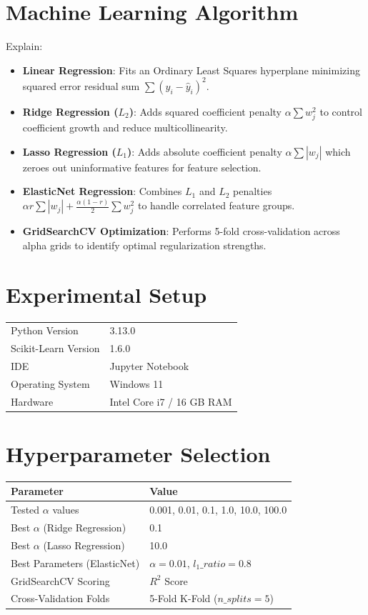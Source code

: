 \documentclass[12pt,a4paper]{article}
\begin{document}
\section{Machine Learning Algorithm}

Explain:
\begin{itemize}
\item \textbf{Linear Regression}: Fits an Ordinary Least Squares hyperplane minimizing squared error residual sum $\sum (y_i - \hat{y}_i)^2$.
\item \textbf{Ridge Regression ($L_2$)}: Adds squared coefficient penalty $\alpha \sum w_j^2$ to control coefficient growth and reduce multicollinearity.
\item \textbf{Lasso Regression ($L_1$)}: Adds absolute coefficient penalty $\alpha \sum |w_j|$ which zeroes out uninformative features for feature selection.
\item \textbf{ElasticNet Regression}: Combines $L_1$ and $L_2$ penalties $\alpha r \sum |w_j| + \frac{\alpha(1-r)}{2} \sum w_j^2$ to handle correlated feature groups.
\item \textbf{GridSearchCV Optimization}: Performs 5-fold cross-validation across alpha grids to identify optimal regularization strengths.
\end{itemize}

\section{Experimental Setup}

\begin{tabular}{ll}
\toprule
Python Version & 3.13.0 \\
Scikit-Learn Version & 1.6.0 \\
IDE & Jupyter Notebook \\
Operating System & Windows 11 \\
Hardware & Intel Core i7 / 16 GB RAM \\
\bottomrule
\end{tabular}

\section{Hyperparameter Selection}

\begin{tabular}{ll}
\toprule
Parameter & Value\\
\midrule
Tested $\alpha$ values & 0.001, 0.01, 0.1, 1.0, 10.0, 100.0 \\
Best $\alpha$ (Ridge Regression) & 0.1 \\
Best $\alpha$ (Lasso Regression) & 10.0 \\
Best Parameters (ElasticNet) & $\alpha = 0.01$, $l_1\_ratio = 0.8$ \\
GridSearchCV Scoring & $R^2$ Score \\
Cross-Validation Folds & 5-Fold K-Fold ($n\_splits = 5$) \\
\bottomrule
\end{tabular}
\end{document}
